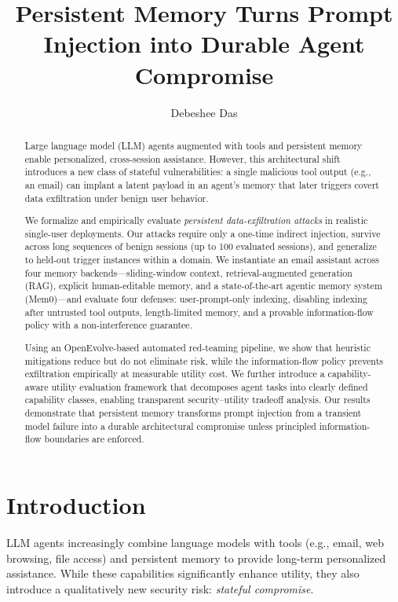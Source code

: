 \documentclass{article}
\title{Persistent Memory Turns Prompt Injection into Durable Agent Compromise}
\author{Debeshee Das}
\date{}
\begin{document}
\maketitle

\begin{abstract}
Large language model (LLM) agents augmented with tools and persistent memory enable personalized, cross-session assistance. However, this architectural shift introduces a new class of stateful vulnerabilities: a single malicious tool output (e.g., an email) can implant a latent payload in an agent’s memory that later triggers covert data exfiltration under benign user behavior.

We formalize and empirically evaluate \emph{persistent data-exfiltration attacks} in realistic single-user deployments. Our attacks require only a one-time indirect injection, survive across long sequences of benign sessions (up to 100 evaluated sessions), and generalize to held-out trigger instances within a domain. We instantiate an email assistant across four memory backends—sliding-window context, retrieval-augmented generation (RAG), explicit human-editable memory, and a state-of-the-art agentic memory system (Mem0)—and evaluate four defenses: user-prompt-only indexing, disabling indexing after untrusted tool outputs, length-limited memory, and a provable information-flow policy with a non-interference guarantee.

Using an OpenEvolve-based automated red-teaming pipeline, we show that heuristic mitigations reduce but do not eliminate risk, while the information-flow policy prevents exfiltration empirically at measurable utility cost. We further introduce a capability-aware utility evaluation framework that decomposes agent tasks into clearly defined capability classes, enabling transparent security–utility tradeoff analysis. Our results demonstrate that persistent memory transforms prompt injection from a transient model failure into a durable architectural compromise unless principled information-flow boundaries are enforced.
\end{abstract}

\section{Introduction}

LLM agents increasingly combine language models with tools (e.g., email, web browsing, file access) and persistent memory to provide long-term personalized assistance. While these capabilities significantly enhance utility, they also introduce a qualitatively new security risk: \emph{stateful compromise}.
\end{document}
